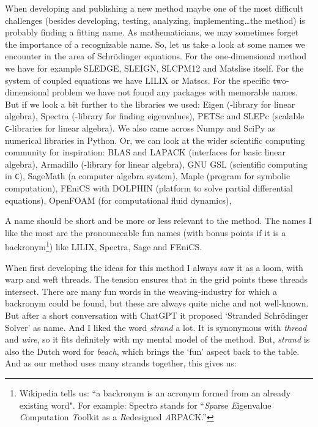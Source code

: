 When developing and publishing a new method maybe one of the most difficult challenges (besides developing, testing, analyzing, implementing\dots the method) is probably finding a fitting name. As mathematicians, we may sometimes forget the importance of a recognizable name. So, let us take a look at some names we encounter in the area of Schrödinger equations. For the one-dimensional method we have for example SLEDGE, SLEIGN, SLCPM12 and Matslise itself. For the system of coupled equations we have LILIX or Matscs. For the specific two-dimensional problem we have not found any packages with memorable names. But if we look a bit further to the libraries we used: Eigen (\cpp{}-library for linear algebra), Spectra (\cpp{}-library for finding eigenvalues), PETSc and SLEPc (scalable \texttt{C}-libraries for linear algebra). We also came across Numpy and SciPy as numerical libraries in Python. Or, we can look at the wider scientific computing community for inspiration: BLAS and LAPACK (interfaces for basic linear algebra), Armadillo (\cpp{}-library for linear algebra), GNU GSL (scientific computing in \texttt{C}), SageMath (a computer algebra system), Maple (program for symbolic computation), FEniCS with DOLPHIN (platform to solve partial differential equations), OpenFOAM (for computational fluid dynamics),

A name should be short and be more or less relevant to the method. The names I like the most are the pronounceable fun names (with bonus points if it is a backronym\footnote{Wikipedia tells us: ``a backronym is an acronym formed from an already existing word". For example: Spectra stands for ``\emph{Sp}arse \emph{E}igenvalue \emph{C}omputation \emph{T}oolkit as a \emph{R}edesigned \emph{A}RPACK.''}) like LILIX, Spectra, Sage and FEniCS.

When first developing the ideas for this method I always saw it as a loom, with warp and weft threads. The tension ensures that in the grid points these threads intersect. There are many fun words in the weaving-industry for which a backronym could be found, but these are always quite niche and not well-known. But after a short conversation with ChatGPT it proposed `Stranded Schrödinger Solver' as name. And I liked the word \emph{strand} a lot. It is synonymous with \emph{thread} and \emph{wire}, so it fits definitely with my mental model of the method. But, \emph{strand} is also the Dutch word for \emph{beach}, which brings the `fun' aspect back to the table. And as our method uses many strands together, this gives us:

